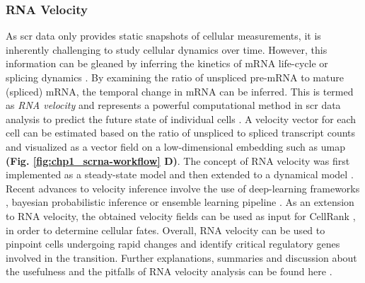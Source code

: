 \subsubsection{RNA Velocity}
As \gls{scr} data only provides static snapshots of cellular measurements, it is inherently challenging to study cellular dynamics over time. However, this information can be gleaned by inferring the kinetics of mRNA life-cycle or splicing dynamics%
. By examining the ratio of unspliced pre-mRNA to mature (spliced) mRNA, the temporal change in mRNA can be inferred. This is termed as \textit{RNA velocity} and represents a powerful computational method in \gls{scr} data analysis to predict the future state of individual cells \textbf{\cite{weiler_guide_2022}}. A velocity vector for each cell can be estimated based on the ratio of unspliced to spliced transcript counts and visualized as a vector field on a low-dimensional embedding such as \gls{umap} \textbf{(Fig. \ref{fig:chp1_scrna-workflow} D)}. The concept of RNA velocity was first implemented as a steady-state model \textbf{\cite{la_manno_rna_2018}} and then extended to a dynamical model \textbf{\cite{bergen_generalizing_2020}}. Recent advances to velocity inference involve the use of deep-learning frameworks \textbf{\cite{li_relay_2024}}, bayesian probabilistic inference \textbf{\cite{qin_pyro-velocity_2022}} or ensemble learning pipeline \textbf{\cite{wang_velo-predictor_2021}}. 
As an extension to RNA velocity, the obtained velocity fields can be used as input for CellRank \textbf{\cite{lange_cellrank_2022}}, in order to determine cellular fates. Overall, RNA velocity can be used to pinpoint cells undergoing rapid changes and identify critical regulatory genes involved in the transition. Further explanations, summaries and discussion about the usefulness and the pitfalls of RNA velocity analysis can be found here \textbf{\cite{bergen_rna_2021,zheng_pumping_2022}}.

